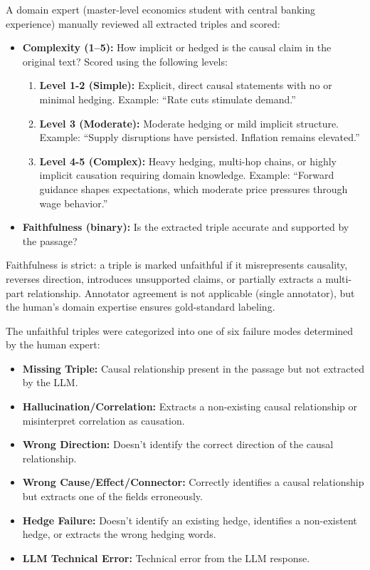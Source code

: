 \documentclass[11pt]{article}
\begin{document}
A domain expert (master-level economics student with central banking experience) manually reviewed all extracted triples and scored:
\begin{itemize}
    \item \textbf{Complexity (1--5):} How implicit or hedged is the causal claim in the original text? Scored using the following levels:
    \begin{enumerate}
        \item \textbf{Level 1-2 (Simple):} Explicit, direct causal statements with no or minimal hedging. Example: ``Rate cuts stimulate demand.''
        \item \textbf{Level 3 (Moderate):} Moderate hedging or mild implicit structure. Example: ``Supply disruptions have persisted. Inflation remains elevated.'' 
        \item \textbf{Level 4-5 (Complex):} Heavy hedging, multi-hop chains, or highly implicit causation requiring domain knowledge. Example: ``Forward guidance shapes expectations, which moderate price pressures through wage behavior.''

    \end{enumerate}
    \item \textbf{Faithfulness (binary):} Is the extracted triple accurate and supported by the passage?
\end{itemize}

Faithfulness is strict: a triple is marked unfaithful if it misrepresents causality, reverses direction, introduces unsupported claims, or partially extracts a multi-part relationship. Annotator agreement is not applicable (single annotator), but the human's domain expertise ensures gold-standard labeling.

The unfaithful triples were categorized into one of six failure modes determined by the human expert:
\begin{itemize}
    \item \textbf{Missing Triple:} Causal relationship present in the passage but not extracted by the LLM.
    \item \textbf{Hallucination/Correlation:} Extracts a non-existing causal relationship or misinterpret correlation as causation.
    \item \textbf{Wrong Direction:} Doesn't identify the correct direction of the causal relationship.
    \item \textbf{Wrong Cause/Effect/Connector:} Correctly identifies a causal relationship but extracts one of the fields erroneously.
    \item \textbf{Hedge Failure:} Doesn't identify an existing hedge, identifies a non-existent hedge, or extracts the wrong hedging words.
    \item \textbf{LLM Technical Error:} Technical error from the LLM response.
\end{itemize}
\end{document}

